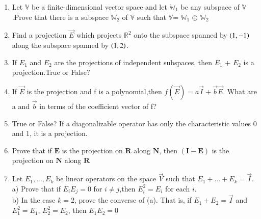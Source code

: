 \renewcommand{\theequation}{\theenumi}
\renewcommand{\thefigure}{\theenumi}
\begin{enumerate}[label=\thesubsection.\arabic*.,ref=\thesubsection.\theenumi]

\item Let $\mathbb{V}$ be a finite-dimensional vector space and let $\mathbb{W}_1$ be any subspace of $\mathbb{V}$.Prove that there is a subspace $\mathbb{W}_2$ of $\mathbb{V}$ such that $\mathbb{V}$= $\mathbb{W}_1$ $\oplus$ $\mathbb{W}_2$
%
\\
\solution

\item Find a projection $\vec{E}$ which projects $\mathbb{R}^{2}$ onto the subspace spanned by $\left(1,-1\right)$ along the subspace spanned by $\left(1,2\right)$.
%
\\
\solution

\item %
If $E_1$ and $E_2$ are the projections of independent subspaces, then $E_1$ + $E_2$ is a projection.True or False?
%
\\
\solution

\item If $\vec{E}$ is the projection and f is a polynomial,then $f(\vec{E})=a\vec{I}+\vec{b}\vec{E}$. What are a and $\vec{b}$ in terms of the coefficient vector of f?
%
\\
\solution

\item %
True or False? If a diagonalizable operator has only the characteristic values $0$ and $1$, it is a projection.
%
\\
\solution

\item 	Prove that if $\mathbf{E}$ is the projection on $\mathbf{R}$ along $\mathbf{N}$, then $(\mathbf{I-E})$ is the projection on $\mathbf{N}$ along $\mathbf{R}$ 
%
\\
\solution

\item Let $E_1,...,E_k$ be linear operators on the space $\vec{V}$ such that $E_1+...+E_k =\vec{I}$.\\
a) Prove that if $E_iE_j = 0$ for $i\neq j$,then $E_i^2=E_i$ for each $i$.\\
b) In the case $k=2$, prove the converse of (a). That is, if $E_1+E_2=\vec{I}$ and $E_1^2 = E_1$, $E_2^2= E_2$, then $E_1E_2=0$
%
\\
\solution

\end{enumerate}

